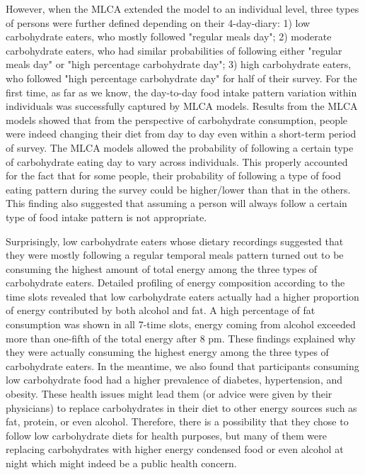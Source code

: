 However, when the MLCA extended the model to an individual level, three types of persons were further defined depending on their 4-day-diary: 1) low carbohydrate eaters, who mostly followed "regular meals day"; 2) moderate carbohydrate eaters, who had similar probabilities of following either "regular meals day" or "high percentage carbohydrate day"; 3) high carbohydrate eaters, who followed "high percentage carbohydrate day" for half of their survey. For the first time, as far as we know, the day-to-day food intake pattern variation within individuals was successfully captured by MLCA models. Results from the MLCA models showed that from the perspective of carbohydrate consumption, people were indeed changing their diet from day to day even within a short-term period of survey. The MLCA models allowed the probability of following a certain type of carbohydrate eating day to vary across individuals. This properly accounted for the fact that for some people, their probability of following a type of food eating pattern during the survey could be higher/lower than that in the others. This finding also suggested that assuming a person will always follow a certain type of food intake pattern is not appropriate.

Surprisingly, low carbohydrate eaters whose dietary recordings suggested that they were mostly following a regular temporal meals pattern turned out to be consuming the highest amount of total energy among the three types of carbohydrate eaters. Detailed profiling of energy composition according to the time slots revealed that low carbohydrate eaters actually had a higher proportion of energy contributed by both alcohol and fat. A high percentage of fat consumption was shown in all 7-time slots, energy coming from alcohol exceeded more than one-fifth of the total energy after 8 pm. These findings explained why they were actually consuming the highest energy among the three types of carbohydrate eaters. In the meantime, we also found that participants consuming low carbohydrate food had a higher prevalence of diabetes, hypertension, and obesity. These health issues might lead them (or advice were given by their physicians) to replace carbohydrates in their diet to other energy sources such as fat, protein, or even alcohol. Therefore, there is a possibility that they chose to follow low carbohydrate diets for health purposes, but many of them were replacing carbohydrates with higher energy condensed food or even alcohol at night which might indeed be a public health concern. 

